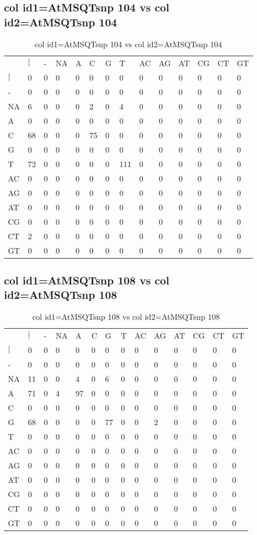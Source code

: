 \subsection{col id1=AtMSQTsnp 104 vs col id2=AtMSQTsnp 104}
\begin{center}
\begin{longtable}{|l|l|l|l|l|l|l|l|l|l|l|l|l|l|}
\caption{col id1=AtMSQTsnp 104 vs col id2=AtMSQTsnp 104} \label{table_dm688}\\
\hline
\\
\hline
&$|$&-&NA&A&C&G&T&AC&AG&AT&CG&CT&GT\\
$|$&0&0&0&0&0&0&0&0&0&0&0&0&0\\
-&0&0&0&0&0&0&0&0&0&0&0&0&0\\
NA&6&0&0&0&2&0&4&0&0&0&0&0&0\\
A&0&0&0&0&0&0&0&0&0&0&0&0&0\\
C&68&0&0&0&75&0&0&0&0&0&0&0&0\\
G&0&0&0&0&0&0&0&0&0&0&0&0&0\\
T&72&0&0&0&0&0&111&0&0&0&0&0&0\\
AC&0&0&0&0&0&0&0&0&0&0&0&0&0\\
AG&0&0&0&0&0&0&0&0&0&0&0&0&0\\
AT&0&0&0&0&0&0&0&0&0&0&0&0&0\\
CG&0&0&0&0&0&0&0&0&0&0&0&0&0\\
CT&2&0&0&0&0&0&0&0&0&0&0&0&0\\
GT&0&0&0&0&0&0&0&0&0&0&0&0&0\\
\hline
\end{longtable}
\end{center}

\subsection{col id1=AtMSQTsnp 108 vs col id2=AtMSQTsnp 108}
\begin{center}
\begin{longtable}{|l|l|l|l|l|l|l|l|l|l|l|l|l|l|}
\caption{col id1=AtMSQTsnp 108 vs col id2=AtMSQTsnp 108} \label{table_dm690}\\
\hline
\\
\hline
&$|$&-&NA&A&C&G&T&AC&AG&AT&CG&CT&GT\\
$|$&0&0&0&0&0&0&0&0&0&0&0&0&0\\
-&0&0&0&0&0&0&0&0&0&0&0&0&0\\
NA&11&0&0&4&0&6&0&0&0&0&0&0&0\\
A&71&0&4&97&0&0&0&0&0&0&0&0&0\\
C&0&0&0&0&0&0&0&0&0&0&0&0&0\\
G&68&0&0&0&0&77&0&0&2&0&0&0&0\\
T&0&0&0&0&0&0&0&0&0&0&0&0&0\\
AC&0&0&0&0&0&0&0&0&0&0&0&0&0\\
AG&0&0&0&0&0&0&0&0&0&0&0&0&0\\
AT&0&0&0&0&0&0&0&0&0&0&0&0&0\\
CG&0&0&0&0&0&0&0&0&0&0&0&0&0\\
CT&0&0&0&0&0&0&0&0&0&0&0&0&0\\
GT&0&0&0&0&0&0&0&0&0&0&0&0&0\\
\hline
\end{longtable}
\end{center}

